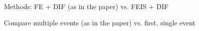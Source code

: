\begin{figure}
    \caption{Methods: FE + DIF (as in the paper) vs. FEIS + DIF}
    \label{graph_compare_model_feis}
\end{figure}

\begin{figure}
    \caption{Compare multiple events (as in the paper) vs. first, single event}
    \label{graph_sensitivity_single_multiple_events}
\end{figure}{}



